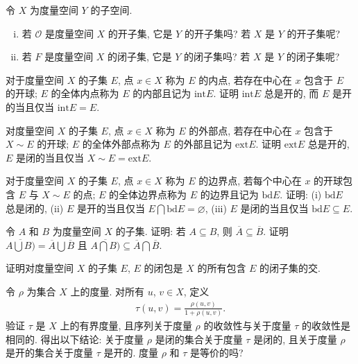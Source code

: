 \documentclass[../../main.tex]{subfiles}
\begin{document}
\begin{exercise}\label{exercise:ch09-19}
令 $X$ 为度量空间 $Y$ 的子空间.
\begin{enumerate}[(i)]
\item 若 $\mathcal{O}$ 是度量空间 $X$ 的开子集, 它是 $Y$ 的开子集吗? 若 $X$ 是 $Y$ 的开子集呢?
\item 若 $F$ 是度量空间 $X$ 的闭子集, 它是 $Y$ 的闭子集吗? 若 $X$ 是 $Y$ 的闭子集呢?
\end{enumerate}
\end{exercise}

\begin{exercise}\label{exercise:ch09-20}
对于度量空间 $X$ 的子集 $E$, 点 $x\in X$ 称为 $E$ 的内点, 若存在中心在 $x$ 包含于 $E$ 的开球; $E$ 的全体内点称为 $E$ 的内部且记为 $\mathrm{int}E$. 证明 $\mathrm{int}E$ 总是开的, 而 $E$ 是开的当且仅当 $\mathrm{int}E=E$.
\end{exercise}

\begin{exercise}\label{exercise:ch09-21}
对度量空间 $X$ 的子集 $E$, 点 $x\in X$ 称为 $E$ 的外部点, 若存在中心在 $x$ 包含于 $X\sim E$ 的开球; $E$ 的全体外部点称为 $E$ 的外部且记为 $\mathrm{ext}E$. 证明 $\mathrm{ext}E$ 总是开的, $E$ 是闭的当且仅当 $X\sim E=\mathrm{ext}E$.
\end{exercise}

\begin{exercise}\label{exercise:ch09-22}
对于度量空间 $X$ 的子集 $E$, 点 $x\in X$ 称为 $E$ 的边界点, 若每个中心在 $x$ 的开球包含 $E$ 与 $X\sim E$ 的点; $E$ 的全体边界点称为 $E$ 的边界且记为 $\mathrm{bd}E$. 证明: (i) $\mathrm{bd}E$ 总是闭的, (ii) $E$ 是开的当且仅当 $E\bigcap\mathrm{bd}E=\varnothing $, (iii) $E$ 是闭的当且仅当 $\mathrm{bd}E\subseteq E$.
\end{exercise}

\begin{exercise}\label{exercise:ch09-23}
令 $A$ 和 $B$ 为度量空间 $X$ 的子集. 证明: 若 $A\subseteq B$, 则 $\overline{A}\subseteq\overline{B}$. 证明 $\overline{A\bigcup B)}=\overline{A}\bigcup\overline{B}$ 且 $\overline{A\bigcap B)}\subseteq\overline{A}\bigcap\overline{B}$.
\end{exercise}

\begin{exercise}\label{exercise:ch09-24}
证明对度量空间 $X$ 的子集 $E$, $E$ 的闭包是 $X$ 的所有包含 $E$ 的闭子集的交.
\end{exercise}

\begin{exercise}\label{exercise:ch09-25}
令 $\rho$ 为集合 $X$ 上的度量. 对所有 $u$, $v\in X$, 定义
\begin{align*}
\tau(u,v)=\frac{\rho(u,v)}{1+\rho(u,v)}.
\end{align*}
验证 $\tau$ 是 $X$ 上的有界度量, 且序列关于度量 $\rho$ 的收敛性与关于度量 $\tau$ 的收敛性是相同的. 得出以下结论: 关于度量 $\rho$ 是闭的集合关于度量 $\tau$ 是闭的, 且关于度量 $\rho$ 是开的集合关于度量 $\tau$ 是开的. 度量 $\rho$ 和 $\tau$ 是等价的吗?
\end{exercise}
\end{document}
